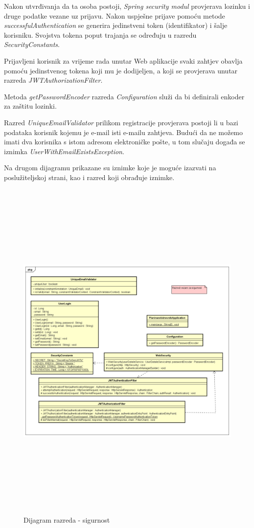 			 Nakon utvrđivanja da ta osoba postoji, \textit{Spring security modul} provjerava lozinku i druge podatke vezane uz prijavu. Nakon uspješne prijave pomoću metode \textit{successfulAuthentication} se generira jedinstveni token (identifikator) i šalje korisniku. Svojstva tokena poput trajanja se određuju u razredu \textit{SecurityConstants}. 
			
			Prijavljeni korisnik za vrijeme rada unutar Web aplikacije svaki zahtjev obavlja pomoću jedinstvenog tokena koji mu je dodijeljen, a koji se provjerava unutar razreda \textit{JWTAuthorizationFilter}. 
			
			Metoda \textit{getPasswordEncoder} razreda \textit{Configuration} služi da bi definirali enkoder za zaštitu lozinki. 
			
			Razred \textit{UniqueEmailValidator} prilikom registracije provjerava postoji li u bazi podataka korisnik kojemu je e-mail isti e-mailu zahtjeva. Budući da ne možemo imati dva korisnika s istom adresom elektroničke pošte, u tom slučaju događa se iznimka \textit{UserWithEmailExistsException}.
			
			Na drugom dijagramu prikazane su iznimke koje je moguće izazvati na poslužiteljskoj strani, kao i razred koji obrađuje iznimke.  
		
			\begin{figure}[H]
				\includegraphics[scale=0.6, height=175mm, width=165mm]{dijagrami/helpers-class.png} %
				\centering
				\caption{Dijagram razreda - sigurnost}
				\label{fig:dijagrami_razreda5}
			\end{figure}
		
